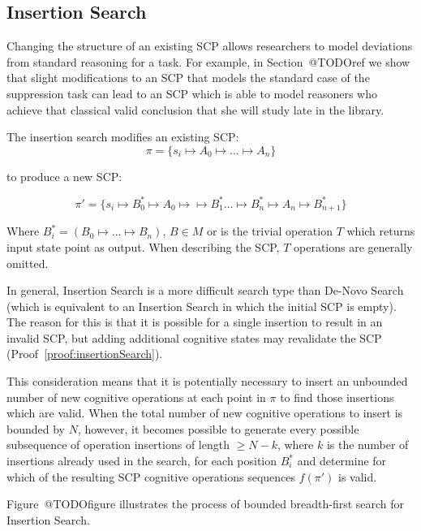 \subsection{Insertion Search}\label{ssec:insertion}

Changing the structure of an existing SCP allows researchers to model deviations from standard reasoning for a task. For example, in Section~@TODOref we show that slight modifications to an SCP that models the standard case of the suppression task can lead to an SCP which is able to model reasoners who achieve that classical valid conclusion that she will study late in the library.

The insertion search modifies an existing SCP:
\[\pi=\{s_i \longmapsto A_0 \longmapsto ... \longmapsto A_n\}\]

to produce a new SCP:

\[
\pi'=\{s_i \longmapsto B^*_0 \longmapsto A_0 \longmapsto \longmapsto B^*_1... \longmapsto  B^*_n \longmapsto A_n \longmapsto  B^*_{n+1}\}
\] 

Where $B^*_i = (B_0\longmapsto ...\longmapsto B_n)$, $B \in M$  or is the trivial operation $T$ which returns input state point as output. When describing the SCP, $T$ operations are generally omitted.

In general, Insertion Search is a more difficult search type than De-Novo Search (which is equivalent to an Insertion Search in which the initial SCP is empty). The reason for this is that it is possible for a single insertion to result in an invalid SCP, but adding additional cognitive states may revalidate the SCP (Proof~\ref{proof:insertionSearch}).

This consideration means that it is potentially necessary to insert an unbounded number of new cognitive operations at each point in $\pi$ to find those insertions which are valid. When the total number of new cognitive operations to insert is bounded by $N$, however, it becomes possible to generate every possible subsequence of operation insertions of length $\geq N-k$, where $k$ is the number of insertions already used in the search, for each position $B^*_i$ and determine for which of the resulting SCP cognitive operations sequences $f(\pi')$ is valid.

Figure~@TODOfigure illustrates the process of bounded breadth-first search for Insertion Search.


